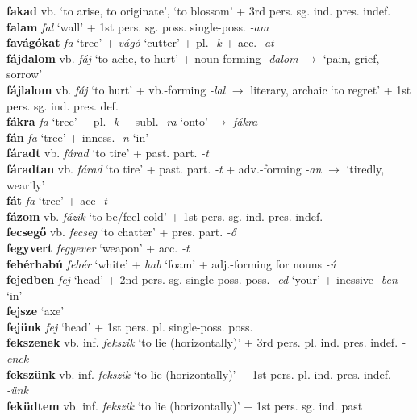 \documentclass[11pt]{article}
\begin{document}
\textbf{fakad} vb. `to arise, to originate', `to blossom' + 3rd
pers. sg. ind. pres. indef. \\
\textbf{falam} \emph{fal} `wall' + 1st pers. sg. poss. single\hyp{}poss. \emph{-am} \\
\textbf{favágókat} \emph{fa} `tree' + \emph{vágó} `cutter' +
pl. \emph{-k} + acc. \emph{-at} \\
\textbf{fájdalom} vb. \emph{fáj} `to ache, to hurt' +
noun\hyp{}forming \emph{-dalom} $\rightarrow$ `pain, grief, sorrow' \\
\textbf{fájlalom} vb. \emph{fáj} `to hurt' + vb.-forming \emph{-lal}
$\rightarrow$ literary, archaic `to regret' + 1st
pers. sg. ind. pres. def. \\
\textbf{fákra} \emph{fa} `tree' + pl. \emph{-k} + subl. \emph{-ra}
`onto' $\rightarrow$ \emph{fákra} \\
\textbf{fán} \emph{fa} `tree' + inness. \emph{-n} `in' \\
\textbf{fáradt} vb. \emph{fárad} `to tire' + past. part. \emph{-t} \\
\textbf{fáradtan} vb. \emph{fárad} `to tire' + past. part. \emph{-t} +
adv.\hyp{}forming \emph{-an} $\rightarrow$ `tiredly, wearily' \\
\textbf{fát} \emph{fa} `tree' + acc \emph{-t} \\
\textbf{fázom} vb. \emph{fázik} `to be/feel cold' + 1st pers. sg. ind.
pres. indef. \\
\textbf{fecsegő} vb. \emph{fecseg} `to chatter' + pres. part. \emph{-ő} \\
\textbf{fegyvert} \emph{fegyever} `weapon' + acc. \emph{-t} \\
\textbf{fehérhabú} \emph{fehér} `white' + \emph{hab} `foam'
+ adj.\hyp{}forming for nouns \emph{-ú} \\
\textbf{fejedben} \emph{fej} `head' + 2nd
pers. sg. single\hyp{}poss. poss. \emph{-ed} `your' +
inessive \emph{-ben} `in' \\
\textbf{fejsze} `axe' \\
\textbf{fejünk} \emph{fej} `head' + 1st
pers. pl. single\hyp{}poss. poss. \\
\textbf{fekszenek} vb. inf. \emph{fekszik} `to lie (horizontally)' +
3rd pers. pl. ind. pres. indef. \emph{-enek} \\
\textbf{fekszünk} vb. inf. \emph{fekszik} `to lie (horizontally)' +
1st pers. pl. ind. pres. indef. \emph{-ünk} \\
\textbf{feküdtem} vb. inf. \emph{fekszik} `to lie (horizontally)'  +
1st pers. sg. ind. past \\
\end{document}

